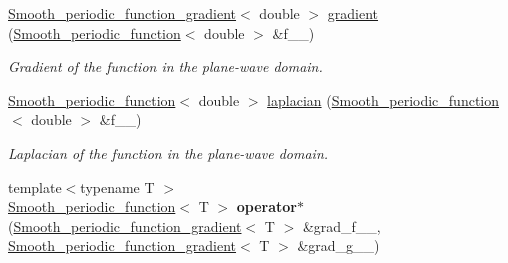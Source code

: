 \begin{DoxyCompactItemize}
\item 
\hyperlink{classsirius_1_1_smooth__periodic__function__gradient}{Smooth\+\_\+periodic\+\_\+function\+\_\+gradient}$<$ double $>$ \hyperlink{namespacesirius_a6052058466addab17b0c2a45e1ec3f43}{gradient} (\hyperlink{classsirius_1_1_smooth__periodic__function}{Smooth\+\_\+periodic\+\_\+function}$<$ double $>$ \&f\+\_\+\+\_\+)
\begin{DoxyCompactList}\small\item\em Gradient of the function in the plane-\/wave domain. \end{DoxyCompactList}\item 
\hyperlink{classsirius_1_1_smooth__periodic__function}{Smooth\+\_\+periodic\+\_\+function}$<$ double $>$ \hyperlink{namespacesirius_a75083934e73f314246096173230a0da1}{laplacian} (\hyperlink{classsirius_1_1_smooth__periodic__function}{Smooth\+\_\+periodic\+\_\+function}$<$ double $>$ \&f\+\_\+\+\_\+)
\begin{DoxyCompactList}\small\item\em Laplacian of the function in the plane-\/wave domain. \end{DoxyCompactList}\item 
\hypertarget{namespacesirius_a72c36956f7641ddf7e556db8dfb7e1bd}{}{\footnotesize template$<$typename T $>$ }\\\hyperlink{classsirius_1_1_smooth__periodic__function}{Smooth\+\_\+periodic\+\_\+function}$<$ T $>$ {\bfseries operator$\ast$} (\hyperlink{classsirius_1_1_smooth__periodic__function__gradient}{Smooth\+\_\+periodic\+\_\+function\+\_\+gradient}$<$ T $>$ \&grad\+\_\+f\+\_\+\+\_\+, \hyperlink{classsirius_1_1_smooth__periodic__function__gradient}{Smooth\+\_\+periodic\+\_\+function\+\_\+gradient}$<$ T $>$ \&grad\+\_\+g\+\_\+\+\_\+)\label{namespacesirius_a72c36956f7641ddf7e556db8dfb7e1bd}


\end{DoxyCompactItemize}

